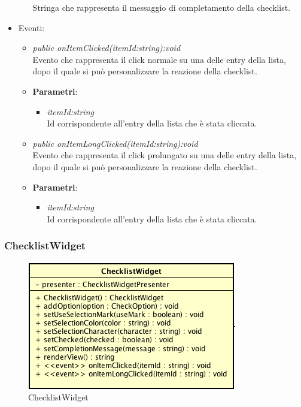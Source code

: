 \begin{itemize}
\begin{itemize}
{\begin{itemize}
		Stringa che rappresenta il messaggio di completamento della checklist.
		\end{itemize}}
	\end{itemize}
\item{Eventi}:
	\begin{itemize}
	\item \textit{public onItemClicked(itemId:string):void}\\
	Evento che rappresenta il click normale su una delle entry della lista, dopo il quale si può personalizzare la reazione della checklist.
		\item{\textbf{Parametri}: \begin{itemize}
		\item \textit{itemId:string}\\
		Id corrispondente all'entry della lista che è stata cliccata.
		\end{itemize}}
	\item \textit{public onItemLongClicked(itemId:string):void}\\
	Evento che rappresenta il click prolungato su una delle entry della lista, dopo il quale si può personalizzare la reazione della checklist.
		\item{\textbf{Parametri}: \begin{itemize}
		\item \textit{itemId:string}\\
		Id corrispondente all'entry della lista che è stata cliccata.
		\end{itemize}}
	\end{itemize}
\end{itemize}

\subsubsection{ChecklistWidget}

\label{ChecklistWidget}
\begin{figure}[ht]
	\centering
	\includegraphics[scale=0.5]{Sezioni/SottosezioniST/img/ChecklistWidget.png}
	\caption{ChecklistWidget}
\end{figure}

